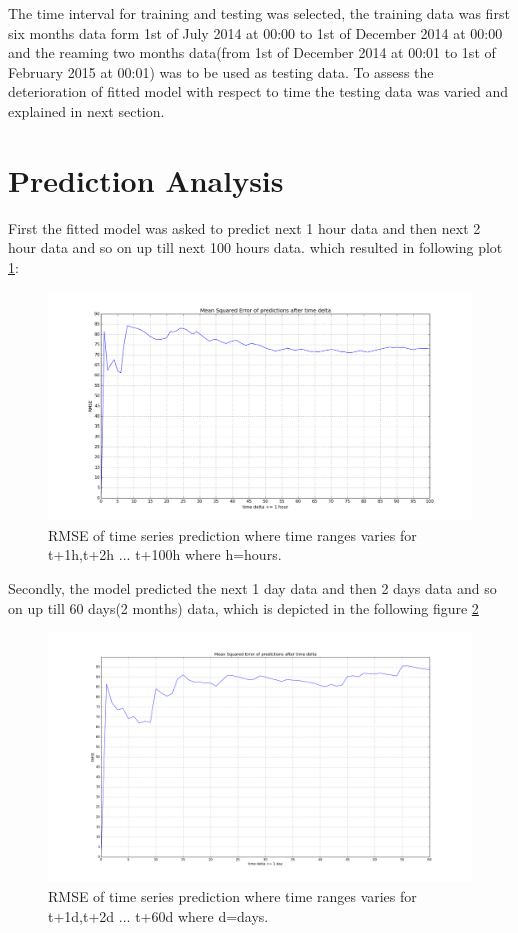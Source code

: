 \documentclass{scrartcl}
\begin{document}
The time interval for training and testing was selected, the training data was first six months data form 1st of July 2014 at 00:00 to 1st of December 2014 at 00:00 and the reaming two months data(from 1st of December 2014 at 00:01 to 1st of February 2015 at 00:01) was to be used as testing data. To assess the deterioration of fitted model with respect to time the testing data was varied and explained in next section.

\section{Prediction Analysis}
%
First the fitted model was asked to predict next 1 hour data and then next 2 hour data and so on up till next 100 hours data. which resulted in following plot \ref{fig:hourly_time_delta}:

\begin{figure}[H]
  \centering
  \includegraphics[width=1\linewidth]{img/hourly_time_delta_test.png}
  \caption[This is needed]{RMSE of time series prediction where time ranges varies for t+1h,t+2h ... t+100h where h=hours.\footnotemark}
  \label{fig:hourly_time_delta}
\end{figure}
\newpage
Secondly, the model predicted the next 1 day data and then 2 days data and so on up till 60 days(2 months) data, which is depicted in the following figure \ref{fig:daily_time_delta}

\begin{figure}[H]
  \centering
  \includegraphics[width=1\linewidth]{img/daily_time_delta_test.png}
  \caption[This is needed]{RMSE of time series prediction where time ranges varies for t+1d,t+2d ... t+60d where d=days.\footnotemark}
  \label{fig:daily_time_delta}
\end{figure}
\end{document}
